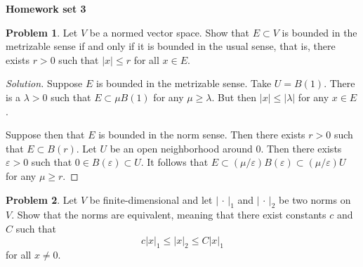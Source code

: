 \documentclass[11pt]{article}
\theoremstyle{definition}
\newtheorem{prob}{Problem}
\def\head{
\begin{center}
\textbf{\LARGE Homework set 3}
\end{center}
\medskip
}
\begin{document}
\head


\begin{prob}
Let $V$ be a normed vector space.
Show that $E \subset V$ is bounded in the metrizable sense
if and only if it is bounded in the usual sense, that is, there exists
$r > 0$ such that $|x| \leq r$ for all $x \in E$.
\end{prob}

\begin{proof}[Solution]
Suppose $E$ is bounded in the metrizable sense.
Take $U = B(1)$.
There is a $\lambda > 0$ such that $E \subset \mu B(1)$ for any $\mu \geq \lambda$.
But then $|x| \leq |\lambda|$ for any $x \in E$.

Suppose then that $E$ is bounded in the norm sense.
Then there exists $r > 0$ such that $E \subset B(r)$.
Let $U$ be an open neighborhood around $0$.
Then there exists $\varepsilon > 0$ such that $0 \in B(\varepsilon) \subset U$.
It follows that $E \subset (\mu/\varepsilon) B(\varepsilon)
\subset (\mu/\varepsilon) U$ for any $\mu \geq r$.
\end{proof}

\begin{prob}
Let $V$ be finite-dimensional and let
$| \, \cdot \, |_1$ and
$| \, \cdot \, |_2$ be two norms on $V$.
Show that the norms are equivalent, meaning that there exist constants $c$ and
$C$ such that
\[
c |x|_1 \leq |x|_2 \leq C|x|_1
\]
for all $x \not= 0$.
\end{prob}
\end{document}
